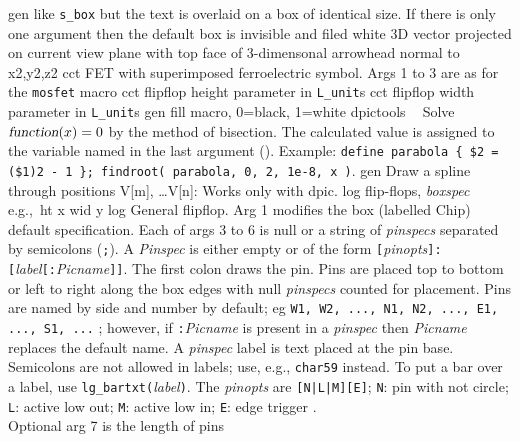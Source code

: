 %

%
  {gen}%
  {like {\tt s\_box} but the text is overlaid on a box of identical size.
   If there is only one argument then the default box
   is invisible and filed white
    }%
%
  {3D}%
  {vector projected on current view plane with top face
   of 3-dimensonal arrowhead normal to x2,y2,z2 }%
%
  {cct}%
  {FET with superimposed ferroelectric symbol. Args 1 to 3 are as for
   the {\tt mosfet} macro
    }%
%
  {cct}%
  {flipflop height parameter in {\tt L\_unit}s}%
%
  {cct}%
  {flipflop width parameter in {\tt L\_unit}s}%
%
  {gen}%
  {fill macro, 0=black, 1=white}%
%
  {dpictools}%
  {$\;\;$ Solve $\hbox{\sl function}(x) = 0$ by the method of 
   bisection.  The calculated value is assigned to the variable named in the
   last argument (). Example:
   {\tt define parabola \{ \$2 = (\$1)2 - 1 \};
   findroot( parabola, 0, 2, 1e-8, x )}. }%
%
  {gen}%
  {Draw a spline through positions V[m], \ldots V[n]: Works only with dpic.}%
%
  {log}%
  {flip-flops,
  {\sl boxspec} e.g.,\ ht x wid y }%
%
  {log}%
  {General flipflop.
   Arg 1 modifies the box (labelled Chip) default specification.
   Each of args 3 to 6 is null or a string of {\sl pinspecs}
   separated by semicolons ({\tt;}).  A {\sl Pinspec} is either empty
   or of the form
   {\tt[}{\sl pinopts}{\tt]:[}{\sl label}{\tt[:}{\sl Picname}{\tt]]}.
   The first colon draws the pin.
   Pins are placed top to bottom or left to right along the box edges with
   null {\sl pinspecs} counted for placement. Pins are named by side and number
   by default; eg {\tt W1, W2, ..., N1, N2, ..., E1, ..., S1, ...} ; however,
   if {\tt:}{\sl Picname} is present in a {\sl pinspec} then {\sl Picname}
   replaces the default name.
   A {\sl pinspec} label is text placed at the pin base. Semicolons are
   not allowed in labels; use, e.g., {\tt {}char59}
   instead.
   To put a bar over a label, use {\tt lg\_bartxt(}{\sl label}{\tt)}.
   The {\sl pinopts} are {\tt[N|L|M][E]};
   {\tt N}: pin with not circle;
   {\tt L}: active low out;
   {\tt M}: active low in;
   {\tt E}: edge trigger .\\
   Optional arg 7 is the length of pins}%
